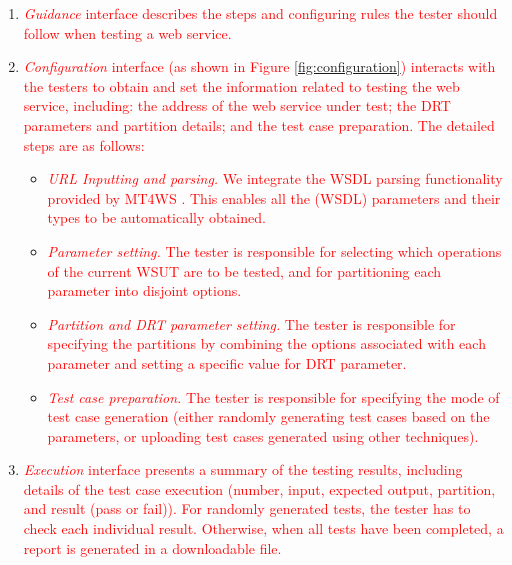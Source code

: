 \documentclass[10pt,journal,compsoc]{IEEEtran}
\begin{document}
\begin{enumerate}[1)]
  \item
  \textcolor{red}{\emph{Guidance} interface describes the steps and configuring rules the tester should follow when testing a web service.}

  \item
  \textcolor{red}{\emph{Configuration} interface (as shown in Figure \ref{fig:configuration}) interacts with the testers to obtain and set the information related to testing the web service, including: the address of the web service under test; the DRT parameters and partition details; and the test case preparation. The detailed steps are as follows:}

  \begin{itemize}
    \item
    \textcolor{red}{\emph{URL Inputting and parsing.} We integrate the WSDL parsing functionality provided by MT4WS \cite{sun2016mt4ws}. This enables all the (WSDL) parameters and their types to be automatically obtained.}
    \item
    \textcolor{red}{\emph{Parameter setting.} The tester is responsible for selecting which operations of the current WSUT are to be tested, and for partitioning each parameter into disjoint options.}
    \item
    \textcolor{red}{\emph{Partition and DRT parameter setting.} The tester is responsible for specifying the partitions by combining the options associated with each parameter and setting a specific value for DRT parameter.}
    \item
    \textcolor{red}{\emph{Test case preparation.} The tester is responsible for specifying the mode of test case generation (either randomly generating test cases based on the parameters, or uploading test cases generated using other techniques).}
  \end{itemize}
  \item
  \textcolor{red}{\emph{Execution} interface presents a summary of the testing results, including details of the test case execution (number, input, expected output, partition, and result (pass or fail)). For randomly generated tests, the tester has to check each individual result. Otherwise, when all tests have been completed, a report is generated in a downloadable file.}
\end{enumerate}
\end{document}

